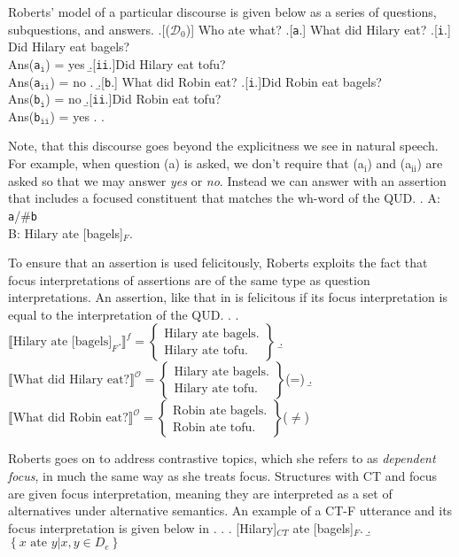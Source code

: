 \documentclass[GPFinal]{subfiles}
\begin{document}
Roberts' model of a particular discourse is given below as a series of questions, subquestions, and answers. 
\ex.[($\mathcal{D}_0$)] Who ate what?
	\a.[\texttt{a}.] What did Hilary eat?
		\a.[\texttt{i}.] Did Hilary eat bagels?\\
		Ans(\texttt{a}$_\texttt{i}$) = yes
		\b.[\texttt{ii}.]Did Hilary eat tofu?\\
		Ans(\texttt{a}$_\texttt{ii}$) = no
		\z.
	\b.[\texttt{b}.] What did Robin eat?
		\a.[\texttt{i}.]Did Robin eat bagels?\\
		Ans(\texttt{b}$_\texttt{i}$) = no
		\b.[\texttt{ii}.]Did Robin eat tofu?\\
		Ans(\texttt{b}$_\texttt{ii}$) = yes
		\z.
	\z.

Note, that this discourse goes beyond the explicitness we see in natural speech.
For example, when question (a) is asked, we don't require that (a$_\text{i}$) and (a$_\text{ii}$) are asked so that we may answer \textit{yes} or \textit{no}.
Instead we can answer with an assertion that includes a focused constituent that matches the wh-word of the QUD.
\ex. A: \texttt{a}/\#\texttt{b}\\
B: Hilary ate [bagels]$_F$.

To ensure that an assertion is used felicitously, Roberts exploits the fact that focus interpretations of assertions are of the same type as question interpretations.
An assertion, like that in \Last is felicitous if its focus interpretation is equal to the interpretation of the QUD.
\ex.
\a.
$\llbracket\text{Hilary ate [bagels]}_F.\rrbracket^f = 
\begin{Bmatrix}
  \text{Hilary ate bagels.}\\
  \text{Hilary ate tofu.}
\end{Bmatrix}
$
\b.
$\llbracket\text{What did Hilary eat?}\rrbracket^\mathcal{O} =
\begin{Bmatrix}
  \text{Hilary ate bagels.}\\
  \text{Hilary ate tofu.}
\end{Bmatrix}
$\hfill (=\Last[a])
\b.
$\llbracket\text{What did Robin eat?}\rrbracket^\mathcal{O} =
\begin{Bmatrix}
  \text{Robin ate bagels.}\\
  \text{Robin ate tofu.}
\end{Bmatrix}
$\hfill ($\neq$\Last[a])

Roberts goes on to address contrastive topics, which she refers to as \textit{dependent focus}, in much the same way as she treats focus.
Structures with CT and focus are given focus interpretation, meaning they are interpreted as a set of alternatives under alternative semantics.
An example of a CT-F utterance and its focus interpretation is given below in \Next.
\ex.
\a. [Hilary]$_{CT}$ ate [bagels]$_F$.
\b. $\left\{ x\text{ ate }y | x,y \in D_e \right\}$
\end{document}
